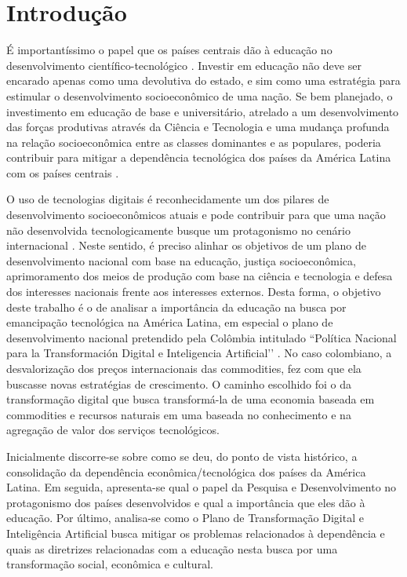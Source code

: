 \chapter{Introdução}
\label{cap:introducao}

É importantíssimo o papel que os países centrais dão à educação no desenvolvimento científico-tecnológico \cite{lima2009politica}. Investir em educação não deve ser encarado apenas como uma devolutiva do estado, e sim como uma estratégia para estimular o desenvolvimento socioeconômico de uma nação. Se bem planejado, o investimento em educação de base e universitário, atrelado a um desenvolvimento das forças produtivas através da Ciência e Tecnologia e uma mudança profunda na relação socioeconômica entre as classes dominantes e as populares, poderia contribuir para mitigar a dependência tecnológica dos países da América Latina com os países centrais \cite{lima2009politica}.

O uso de tecnologias digitais é reconhecidamente um dos pilares de desenvolvimento socioeconômicos atuais \cite{aragon2016notas} e pode contribuir para que uma nação não desenvolvida tecnologicamente busque um protagonismo no cenário internacional \cite{jardim2018}. Neste sentido, é preciso alinhar os objetivos de um plano de desenvolvimento nacional com base na educação, justiça socioeconômica, aprimoramento dos meios de produção com base na ciência e tecnologia e defesa dos interesses nacionais frente aos interesses externos. Desta forma, o objetivo deste trabalho é o de analisar a importância da educação na busca por emancipação tecnológica na América Latina, em especial o plano de desenvolvimento nacional pretendido pela Colômbia intitulado ``Política Nacional para la Transformación Digital e Inteligencia Artificial’’ \cite{de2019politica}. No caso colombiano, a desvalorização dos preços internacionais das commodities, fez com que ela buscasse novas estratégias de crescimento. O caminho escolhido foi o da transformação digital que busca transformá-la de uma economia baseada em commodities e recursos naturais em uma baseada no conhecimento e na agregação de valor dos serviços tecnológicos.

Inicialmente discorre-se sobre como se deu, do ponto de vista histórico, a consolidação da dependência econômica/tecnológica dos países da América Latina. Em seguida, apresenta-se qual o papel da Pesquisa e Desenvolvimento no protagonismo dos países desenvolvidos e qual a importância que eles dão à educação. Por último, analisa-se como o Plano de Transformação Digital e Inteligência Artificial busca mitigar os problemas relacionados à dependência e quais as diretrizes relacionadas com a educação nesta busca por uma transformação social, econômica e cultural.

